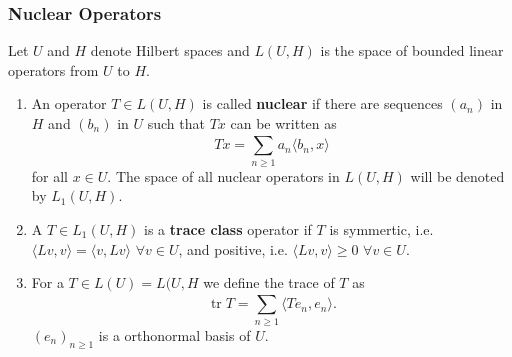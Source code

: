\begin{frame}
    \frametitle{Nuclear Operators}
    
    Let $U$ and $H$ denote Hilbert spaces and $L(U,H)$ is the space of 
    bounded linear operators from $U$ to $H$. 

    \begin{enumerate}
        \item An operator $T \in L(U,H)$ is called \textbf{nuclear} if there
            are sequences $(a_n)$ in $H$ and $(b_n)$ in $U$ such that $Tx$ can
            be written as
            \begin{equation*}
                Tx = \sum_{n\geq 1}^{} a_n \langle b_n, x \rangle
            \end{equation*}
            for all $x\in U$. The space of all nuclear operators in $L(U,H)$
            will be denoted by $L_1(U,H)$. 
        \item A $T \in L_1(U,H)$ is a \textbf{trace class} operator if $T$ is
            symmertic, i.e.  $\langle Lv, v \rangle = \langle v, Lv \rangle$
            $\forall v\in U$, and positive, i.e. $\langle Lv,v  \rangle \geq 0$
            $\forall v\in U$. 
        \item For a $T \in L(U)= L(U,H$ we define the trace of $T$ as
            \begin{equation*}
                \operatorname{tr} T = \sum_{n\geq 1 }^{} \langle T e_n, e_n \rangle.
            \end{equation*}
            $(e_n)_{n\geq 1}$ is a orthonormal basis of $U$. 
    \end{enumerate}
\end{frame}






